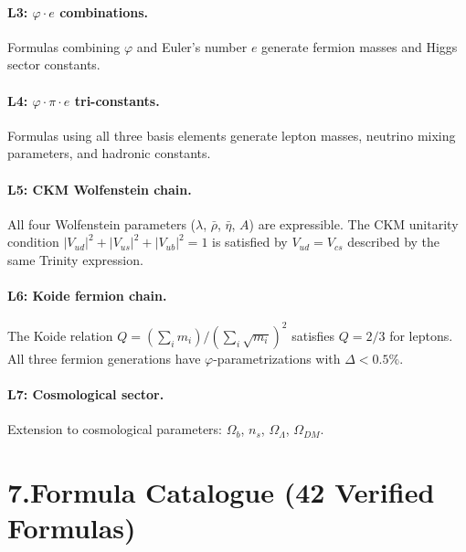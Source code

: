 \documentclass[10pt,a4paper]{article}
\begin{document}
\paragraph{L3: $\varphi\cdot e$ combinations.}
Formulas combining $\varphi$ and Euler's number $e$ generate fermion masses and Higgs sector constants.

\paragraph{L4: $\varphi\cdot\pi\cdot e$ tri-constants.}
Formulas using all three basis elements generate lepton masses, neutrino mixing parameters, and hadronic constants.

\paragraph{L5: CKM Wolfenstein chain.}
All four Wolfenstein parameters ($\lambda$, $\bar\rho$, $\bar\eta$, $A$) are expressible.
The CKM unitarity condition $|V_{ud}|^2 + |V_{us}|^2 + |V_{ub}|^2 = 1$ is satisfied by
$V_{ud} = V_{cs}$ described by the same Trinity expression.

\paragraph{L6: Koide fermion chain.}
The Koide relation $Q = (\sum_i m_i)/(\sum_i \sqrt{m_i})^2$ satisfies $Q=2/3$ for leptons.
All three fermion generations have $\varphi$-parametrizations with $\Delta < 0.5\%$.

\paragraph{L7: Cosmological sector.}
Extension to cosmological parameters: $\Omega_b$, $n_s$, $\Omega_\Lambda$, $\Omega_{DM}$.

\section*{7.\quad Formula Catalogue (42 Verified Formulas)}
\end{document}
